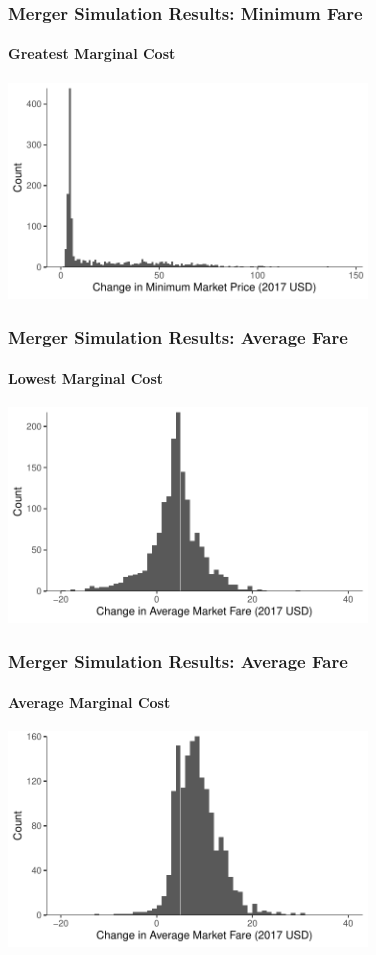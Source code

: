 \documentclass[xcolor=dvipsnames]{beamer}
\begin{document}
		\begin{frame}
			\frametitle{Merger Simulation Results: Minimum Fare}
			\framesubtitle{Greatest Marginal Cost}
			\includegraphics[width = 3.75in]{Merger_Change_MinimumFare_WorstCase.pdf}
       \end{frame}	
       	
       		\begin{frame}
       		\frametitle{Merger Simulation Results: Average Fare}
       		\framesubtitle{Lowest Marginal Cost}
       	\includegraphics[width = 3.75in]{Merger_Change_AverageFare_BestCase.pdf}
       	\end{frame}
       	
       	\begin{frame}
       		\frametitle{Merger Simulation Results: Average Fare}
       		\framesubtitle{Average Marginal Cost}
       		\includegraphics[width = 3.75in]{Merger_Change_AverageFare_AverageCase.pdf}
       	\end{frame}
       	
\end{document}
